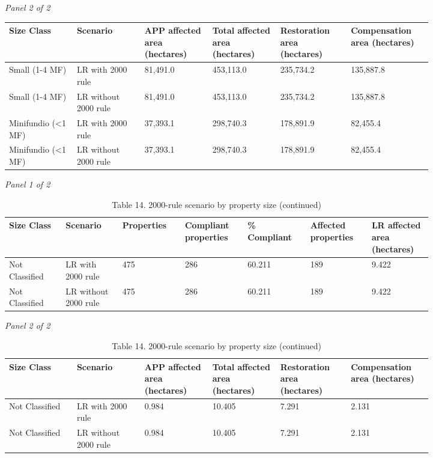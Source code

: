 \documentclass[12pt]{article}
\begin{document}
\begin{landscape}
\begin{table}[H]
\textit{Panel 2 of 2}\\[2pt]
{\fontsize{12}{14}\selectfont
\setlength{\tabcolsep}{3pt}
\renewcommand{\arraystretch}{1.08}
\begin{tabular}{p{0.137\linewidth}p{0.137\linewidth}p{0.137\linewidth}p{0.137\linewidth}p{0.137\linewidth}p{0.137\linewidth}}
\toprule
Size Class & Scenario & APP affected area (hectares) & Total affected area (hectares) & Restoration area (hectares) & Compensation area (hectares) \\
\midrule
Small (1-4 MF) & LR with 2000 rule & 81,491.0 & 453,113.0 & 235,734.2 & 135,887.8 \\
Small (1-4 MF) & LR without 2000 rule & 81,491.0 & 453,113.0 & 235,734.2 & 135,887.8 \\
Minifundio (<1 MF) & LR with 2000 rule & 37,393.1 & 298,740.3 & 178,891.9 & 82,455.4 \\
Minifundio (<1 MF) & LR without 2000 rule & 37,393.1 & 298,740.3 & 178,891.9 & 82,455.4 \\
\bottomrule
\end{tabular}
}
\end{table}
\begin{table}[H]
\centering
\caption{Table 14. 2000-rule scenario by property size (continued)}
\textit{Panel 1 of 2}\\[2pt]
{\fontsize{12}{14}\selectfont
\setlength{\tabcolsep}{3pt}
\renewcommand{\arraystretch}{1.08}
\begin{tabular}{p{0.117\linewidth}p{0.117\linewidth}p{0.117\linewidth}p{0.117\linewidth}p{0.117\linewidth}p{0.117\linewidth}p{0.117\linewidth}}
\toprule
Size Class & Scenario & Properties & Compliant properties & \% Compliant & Affected properties & LR affected area (hectares) \\
\midrule
Not Classified & LR with 2000 rule & 475 & 286 & 60.211 & 189 & 9.422 \\
Not Classified & LR without 2000 rule & 475 & 286 & 60.211 & 189 & 9.422 \\
\bottomrule
\end{tabular}
}

\vspace{0.6em}

\textit{Panel 2 of 2}\\[2pt]
{\fontsize{12}{14}\selectfont
\setlength{\tabcolsep}{3pt}
\renewcommand{\arraystretch}{1.08}
\begin{tabular}{p{0.137\linewidth}p{0.137\linewidth}p{0.137\linewidth}p{0.137\linewidth}p{0.137\linewidth}p{0.137\linewidth}}
\toprule
Size Class & Scenario & APP affected area (hectares) & Total affected area (hectares) & Restoration area (hectares) & Compensation area (hectares) \\
\midrule
Not Classified & LR with 2000 rule & 0.984 & 10.405 & 7.291 & 2.131 \\
Not Classified & LR without 2000 rule & 0.984 & 10.405 & 7.291 & 2.131 \\
\bottomrule
\end{tabular}
}
\end{table}
\end{landscape}
\end{document}
